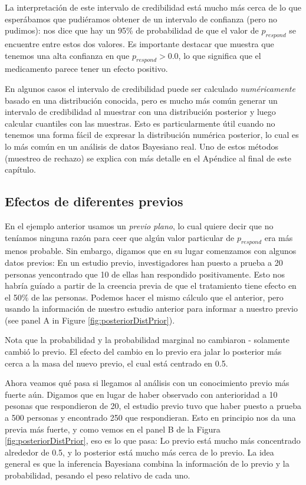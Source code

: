 \documentclass[
  12pt,
]{book}
\theoremstyle{definition}
\theoremstyle{definition}
\theoremstyle{definition}
\theoremstyle{remark}
\begin{document}
La interpretación de este intervalo de credibilidad está mucho más cerca de lo que esperábamos que pudiéramos obtener de un intervalo de confianza (pero no pudimos): nos dice que hay un 95\% de probabilidad de que el valor de \(p_{respond}\) se encuentre entre estos dos valores. Es importante destacar que muestra que tenemos una alta confianza en que \(p_{respond} > 0.0\), lo que significa que el medicamento parece tener un efecto positivo.

En algunos casos el intervalo de credibilidad puede ser calculado \emph{numéricamente} basado en una distribución conocida, pero es mucho más común generar un intervalo de credibilidad al muestrar con una distribución posterior y luego calcular cuantiles con las muestras. Esto es particularmente útil cuando no tenemos una forma fácil de expresar la distribución numérica posterior, lo cual es lo más común en un análisis de datos Bayesiano real. Uno de estos métodos (muestreo de rechazo) se explica con más detalle en el Apéndice al final de este capítulo.

\hypertarget{efectos-de-diferentes-previos}{%
\subsection{Efectos de diferentes previos}\label{efectos-de-diferentes-previos}}

En el ejemplo anterior usamos un \emph{previo plano}, lo cual quiere decir que no teníamos ninguna razón para ceer que algún valor particular de \(p_{respond}\) era más menos probable. Sin embargo, digamos que en su lugar comenzamos con algunos datos previos: En un estudio previo, investigadores han puesto a prueba a 20 personas yencontrado que 10 de ellas han respondido positivamente. Esto nos habría guíado a partir de la creencia previa de que el tratamiento tiene efecto en el 50\% de las personas. Podemos hacer el mismo cálculo que el anterior, pero usando la información de nuestro estudio anterior para informar a nuestro previo (see panel A in Figure \ref{fig:posteriorDistPrior}).

Nota que la probabilidad y la probabilidad marginal no cambiaron - solamente cambió lo previo. El efecto del cambio en lo previo era jalar lo posterior más cerca a la masa del nuevo previo, el cual está centrado en 0.5.

Ahora veamos qué pasa si llegamos al análisis con un conocimiento previo más fuerte aún. Digamos que en lugar de haber observado con anterioridad a 10 pesonas que respondieron de 20, el estudio previo tuvo que haber puesto a prueba a 500 personas y encontrado 250 que respondieran. Esto en principio nos da una previa más fuerte, y como vemos en el panel B de la Figura \ref{fig:posteriorDistPrior}, eso es lo que pasa: Lo previo está mucho más concentrado alrededor de 0.5, y lo posterior está mucho más cerca de lo previo. La idea general es que la inferencia Bayesiana combina la información de lo previo y la probabilidad, pesando el peso relativo de cada uno.
\end{document}
